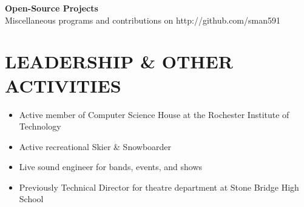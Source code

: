 \documentclass[line]{res}
\begin{document}
\begin{resume}
  \textbf{Open-Source Projects}
  \\
  Miscellaneous programs and contributions on http://github.com/sman591

\section{LEADERSHIP \& OTHER ACTIVITIES}
  \begin{itemize}[leftmargin=10pt]
  \item Active member of Computer Science House at the Rochester Institute of Technology
    \item Active recreational Skier \& Snowboarder
    \item Live sound engineer for bands, events, and shows
    \item Previously Technical Director for theatre department at Stone Bridge High School
  \end{itemize}

\end{resume}
\end{document}
